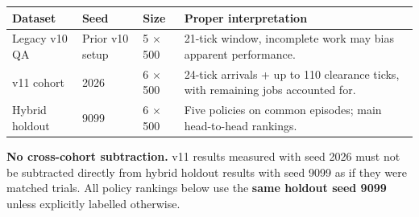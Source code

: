 \documentclass[10pt,a4paper]{article}
\newcommand{\subsect}[1]{\vspace{3mm}{\large\sffamily\bfseries #1}\par\vspace{1mm}}
\begin{document}
\subsect{Independent experiment identities}
\begin{tabularx}{\linewidth}{@{}p{29mm}p{24mm}p{24mm}X@{}}
\toprule
\textbf{Dataset} & \textbf{Seed} & \textbf{Size} & \textbf{Proper interpretation}\\\midrule
Legacy v10 QA & Prior v10 setup & 5 $\times$ 500 & 21-tick window, incomplete work may bias apparent performance.\\
v11 cohort & 2026 & 6 $\times$ 500 & 24-tick arrivals + up to 110 clearance ticks, with remaining jobs accounted for.\\
Hybrid holdout & 9099 & 6 $\times$ 500 & Five policies on common episodes; main head-to-head rankings.\\
\bottomrule
\end{tabularx}
\begin{caution}
\textbf{No cross-cohort subtraction.} v11 results measured with seed 2026 must not be subtracted directly from hybrid holdout results with seed 9099 as if they were matched trials. All policy rankings below use the \textbf{same holdout seed 9099} unless explicitly labelled otherwise.
\end{caution}
\newpage
\end{document}
